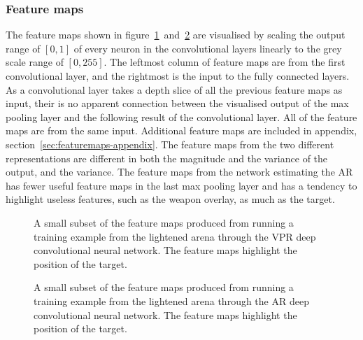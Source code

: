 
\clearpage
\subsubsection{Feature maps}
\label{sec:featuremaps}
The feature maps shown in figure~\ref{fig:featuremapsvpr}~and~\ref{fig:featuremapsangular} are visualised by scaling the output range of $[0,1]$ of every neuron in the convolutional layers linearly to the grey scale range of $[0,255]$. The leftmost column of feature maps are from the first convolutional layer, and the rightmost is the input to the fully connected layers. As a convolutional layer takes a depth slice of all the previous feature maps as input, their is no apparent connection between the visualised output of the max pooling layer and the following result of the convolutional layer. All of the feature maps are from the same input. Additional feature maps are included in appendix, section~\ref{sec:featuremaps-appendix}. The feature maps from the two different representations are different in both the magnitude and the variance of the output, and the variance. The feature maps from the network estimating the AR has fewer useful feature maps in the last max pooling layer and has a tendency to highlight useless features, such as the weapon overlay, as much as the target.

\begin{figure}[H]
	\begin{scriptsize}
		\sffamily
		\def\svgwidth{\textwidth}
		
	\end{scriptsize}
	\caption[Feature maps for the CNN using VPR]{A small subset of the feature maps produced from running a training example from the lightened arena through the VPR deep convolutional neural network. The feature maps highlight the position of the target.}
	\label{fig:featuremapsvpr}
\end{figure}

\begin{figure}[H]
	\begin{scriptsize}
		\sffamily
		\def\svgwidth{\textwidth}
		
	\end{scriptsize}
	\caption[Feature maps for the CNN using AR]{A small subset of the feature maps produced from running a training example from the lightened arena through the AR deep convolutional neural network. The feature maps highlight the position of the target.}
	\label{fig:featuremapsangular}
\end{figure}

